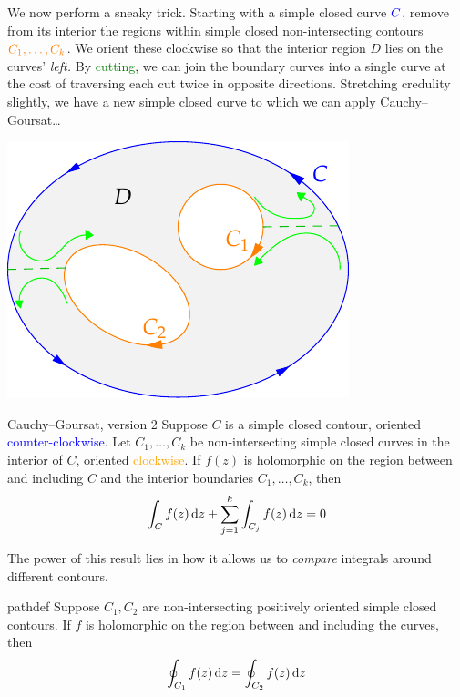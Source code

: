 \begin{minipage}[t]{0.63\linewidth}\vspace{0pt}
We now perform a sneaky trick. Starting with a simple closed curve $\textcolor{blue}{C}$, remove from its interior the regions within simple closed non-intersecting contours $\textcolor{orange}{C_1,\ldots,C_k}$. We orient these clockwise so that the interior region $D$ lies on the curves' \emph{left.}\smallbreak
By \textcolor{Green}{cutting}, we can join the boundary curves into a single curve at the cost of traversing each cut twice in opposite directions. Stretching credulity slightly, we have a new simple closed curve to which we can apply Cauchy--Goursat\ldots
\end{minipage}\begin{minipage}[t]{0.37\linewidth}\vspace{0pt}
\flushright\includegraphics[scale=0.85]{multipleconnected1}
\end{minipage}
\goodbreak



\begin{cor}{Cauchy--Goursat, version 2}{}
Suppose $C$ is a simple closed contour, oriented \textcolor{blue}{counter-clockwise}. Let $C_1,\ldots,C_k$ be non-intersecting simple closed curves in the interior of $C$, oriented \textcolor{orange}{clockwise}. If $f(z)$ is holomorphic on the region between and including $C$ and the interior boundaries $C_1,\ldots, C_k$, then
\[\int_Cf(z)\,{\mathrm{d} z}+\sum_{j=1}^k\int_{C_j}f(z)\,{\mathrm{d} z}=0\]
\end{cor}

The power of this result lies in how it allows us to \emph{compare} integrals around different contours.

\begin{cor}{}{pathdef}
Suppose $C_1,C_2$ are non-intersecting positively oriented simple closed contours. If $f$ is holomorphic on the region between and including the curves, then
\[\oint_{C_1}f(z)\,{\mathrm{d} z}=\oint_{C_2}f(z)\,{\mathrm{d} z}\] 
\end{cor}

